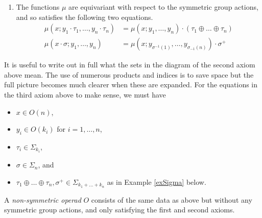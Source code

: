 \documentclass{amsbook} %
\numberwithin{section}{chapter}
\begin{document}
\begin{Defi}
\begin{enumerate}
\item The functions $\mu$ are equivariant with respect to the symmetric group actions, and so satisfies the following two equations.
  \begin{align*}
    \mu(x;y_1 \cdot \tau_1,\ldots,y_n \cdot \tau_n) &= \mu(x;y_1,\ldots,y_n)\cdot(\tau_1 \oplus \ldots \oplus \tau_n)\\
    \mu(x \cdot \sigma; y_1, \ldots, y_n) &= \mu\left(x;y_{\sigma^{-1}(1)},\ldots,y_{\sigma_{-1}(n)}\right)\cdot \sigma^+
  \end{align*}
\end{enumerate}
\end{Defi}

\begin{rem}
It is useful to write out in full what the sets in the diagram of the second axiom above mean. The use of numerous products and indices is to save space but the full picture becomes much clearer when these are expanded. For the equations in the third axiom above to make sense, we must have
\begin{itemize}
\item $x \in O(n)$,
\item $y_{i} \in O(k_{i})$ for $i=1, \ldots, n$,
\item $\tau_{i} \in \Sigma_{k_{i}}$,
\item $\sigma \in \Sigma_{n}$, and
\item $\tau_1 \oplus \ldots \oplus \tau_n , \sigma^{+} \in \Sigma_{k_1 + \ldots + k_n}$ as in Example \ref{exSigma} below.
\end{itemize}

\end{rem}
\begin{Defi}
A \emph{non-symmetric operad} $O$ consists of the same data as above but without any symmetric group actions, and only satisfying the first and second axioms.
\end{Defi}
\end{document}
